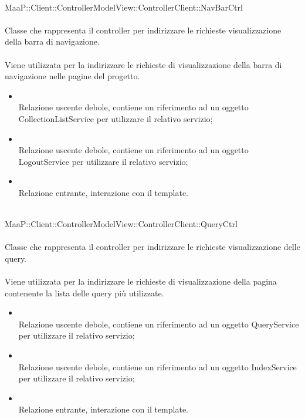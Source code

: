 \\
MaaP::Client::ControllerModelView::ControllerClient::NavBarCtrl\\
\\
Classe che rappresenta il controller per indirizzare le richieste visualizzazione della barra di navigazione.\\
\\
Viene utilizzata per la indirizzare le richieste di visualizzazione della barra di navigazione nelle pagine del progetto.\\
\begin{itemize}
\item{}\\
Relazione uscente debole, contiene un riferimento ad un oggetto CollectionListService per utilizzare il relativo servizio;
\item{}\\
Relazione uscente debole, contiene un riferimento ad un oggetto LogoutService per utilizzare il relativo servizio;
\item{}\\
Relazione entrante, interazione con il template.
\end{itemize}

\\
MaaP::Client::ControllerModelView::ControllerClient::QueryCtrl\\
\\
Classe che rappresenta il controller per indirizzare le richieste visualizzazione delle query.\\
\\
Viene utilizzata per la indirizzare le richieste di visualizzazione della pagina contenente la lista delle query più utilizzate.\\
\begin{itemize}
\item{}\\
Relazione uscente debole, contiene un riferimento ad un oggetto QueryService per utilizzare il relativo servizio;
\item{}\\
Relazione uscente debole, contiene un riferimento ad un oggetto IndexService per utilizzare il relativo servizio;
\item{}\\
Relazione entrante, interazione con il template.
\end{itemize}

